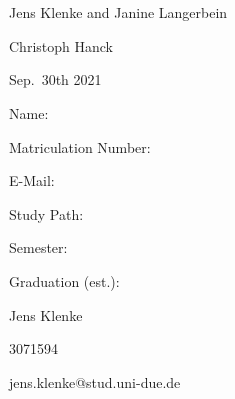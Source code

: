 \documentclass[12pt,a4paper]{article}
\begin{document}
\begin{titlepage}
\begin{center}
  \large{  \\}
  \vspace{0.75cm}
  \large{}\\
  \vspace{0.5cm}
  Jens Klenke and Janine Langerbein\\
  \end{center}
  \vfill
  \hrulefill

  \noindent\begin{minipage}[t]{0.3\textwidth}
  \end{minipage}
  \begin{minipage}[t]{0.7\textwidth}
  \hspace{1cm}Christoph Hanck
  \end{minipage}

  \noindent\begin{minipage}[t]{0.3\textwidth}
  \end{minipage}
  \begin{minipage}[t]{0.7\textwidth}
  \hspace{1cm}Sep.~30th 2021
  \end{minipage}

  \hrulefill

  \begin{multicols}{3}
  
  \begin{scriptsize}
  
  Name:

  Matriculation Number:

  E-Mail:

  Study Path:

  Semester:

  Graduation (est.):
 
  \columnbreak

  Jens Klenke

  3071594
  
  jens.klenke@stud.uni-due.de


\end{scriptsize}
\end{multicols}
\end{titlepage}
\end{document}
